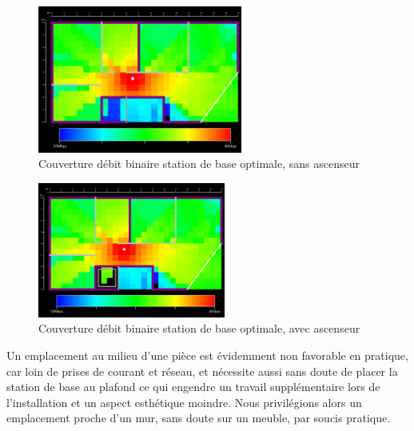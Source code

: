 \begin{figure}[H]
    \centering
    \includegraphics[width=0.6\textwidth]{latex/images/opti-without-lift.png}
    \caption{Couverture débit binaire station de base optimale, sans ascenseur}
    \label{fig:simu-emplacement-couloir-sansasc}
\end{figure}
\begin{figure}[H]
    \centering
    \includegraphics[width=0.55\textwidth]{latex/images/opti-with-lift.png}
    \caption{Couverture débit binaire station de base optimale, avec ascenseur}
    \label{fig:simu-emplacement-couloir-avecasc}
\end{figure}

Un emplacement au milieu d'une pièce est évidemment non favorable en pratique, car loin de prises de courant et réseau, et nécessite aussi sans doute de placer la station de base au plafond ce qui engendre un travail supplémentaire lors de l'installation et un aspect esthétique moindre. Nous privilégions alors un emplacement proche d'un mur, sans doute sur un meuble, par soucis pratique.


